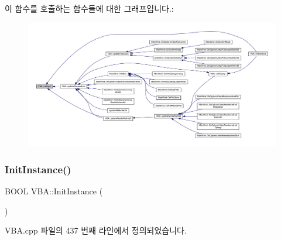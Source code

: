 이 함수를 호출하는 함수들에 대한 그래프입니다.\+:
\nopagebreak
\begin{figure}[H]
\begin{center}
\leavevmode
\includegraphics[width=350pt]{class_v_b_a_ac19c75e259950ddd9bb5e97d73203ebb_icgraph}
\end{center}
\end{figure}
\mbox{\label{class_v_b_a_a35c73ff552824e3eba6e90393a4692d4}} 
\subsubsection{\texorpdfstring{Init\+Instance()}{InitInstance()}}
{\footnotesize\ttfamily B\+O\+OL V\+B\+A\+::\+Init\+Instance (\begin{DoxyParamCaption}{ }\end{DoxyParamCaption})\hspace{0.3cm}{\ttfamily [virtual]}}



V\+B\+A.\+cpp 파일의 437 번째 라인에서 정의되었습니다.


